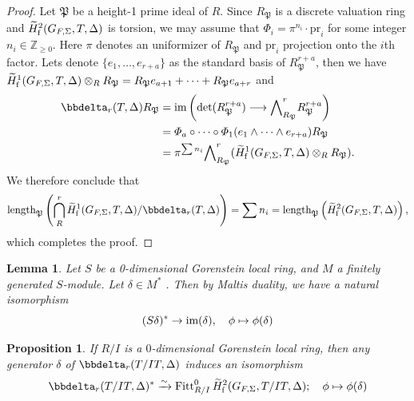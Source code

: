 \documentclass[10pt]{amsart}
\numberwithin{equation}{section}
\newtheorem{prop}[thm]{Proposition}
\newtheorem{lemma}[thm]{Lemma}
\theoremstyle{definition}
\theoremstyle{remark} %
\newcommand{\Fitt}{\operatorname{Fitt}}
\newcommand{\fp}{\mathfrak{P}}
\newcommand{\Z}{\mathbb{Z}}
\begin{document}
		\begin{proof}
			Let $\fp$ be a height-1 prime ideal of $R$. 
			Since $R_\fp$ is a discrete valuation ring and $\widetilde{H}^2_{\rm f}(G_{F, \Sigma}, T, \Delta)$  is torsion, 
			we may assume that $\varPhi_i = \pi^{n_i} \cdot \mathrm{pr}_i$ for some integer $n_i \in \Z_{\ge0} $. 
			Here $\pi$ denotes an uniformizer of $R_\fp$ and $ \mathrm{pr}_i$ projection onto the $i$th factor. 
			Lets denote $\{e_1, \ldots, e_{r+a}\}$ as the standard basis of $R_\fp^{r+a}$, then we have 
			$\widetilde{H}^1_{\rm f}(G_{F, \Sigma}, T, \Delta) \otimes_{R} R_\fp = R_\fp e_{a+1} + \cdots + R_\fp e_{a+r}$ and 
			\begin{align*}
				\bbdelta_r(T, \Delta)R_\fp 
				&= \mathrm{im}\left( \det(R_\fp^{r+a}) \longrightarrow {\bigwedge}^r_{R_\fp}R_\fp^{r+a} \right) 
				\\
				&= \varPhi_a \circ \cdots \circ \varPhi_1(e_1 \wedge \cdots \wedge e_{r+a})R_\fp
				\\
				&= \pi^{\sum n_i} {\bigwedge}^r_{R_\fp} (\widetilde{H}^1_{\rm f}(G_{F, \Sigma}, T, \Delta) \otimes_R R_\fp). 
			\end{align*}
			We therefore conclude that 
			\begin{equation*}
				\mathrm{length}_{\fp} \left( \bigcap^r_R \widetilde{H}^1_{\rm f}(G_{F, \Sigma}, T, \Delta)   /  \bbdelta_r(T, \Delta)  \right) 
				= \sum n_i		
				= \mathrm{length}_{\fp}\left( \widetilde{H}^2_{\rm f}(G_{F, \Sigma}, T, \Delta) \right), 
			\end{equation*}
			which completes the proof. 
		\end{proof}
		\begin{lemma}\cite[Lemma 5.8]{BCS23}
			Let $S$ be a 0-dimensional Gorenstein local ring, and $M$ a finitely generated $S$-module. Let $\delta \in M^*$ . Then by Maltis duality, we have a natural isomorphism 
			$$ (S\delta)^* \rightarrow \rm im (\delta), \quad \phi \mapsto \phi(\delta) $$
		\end{lemma}
		
		
		\begin{prop}
			\label{Fitt}
			If $R/I$ is a $0$-dimensional Gorenstein local ring, then any generator $\delta$ of $\bbdelta_r(T /IT, \Delta)$ induces an isomorphism
			$$ \bbdelta_r (T /IT, \Delta)^* \xrightarrow{\sim} \Fitt^0_{R/I}\widetilde{H}^2_{\mathrm{f}}(G_{F,\Sigma},T /IT,\Delta); \quad \phi \mapsto \phi(\delta) $$
		\end{prop}
\end{document}
